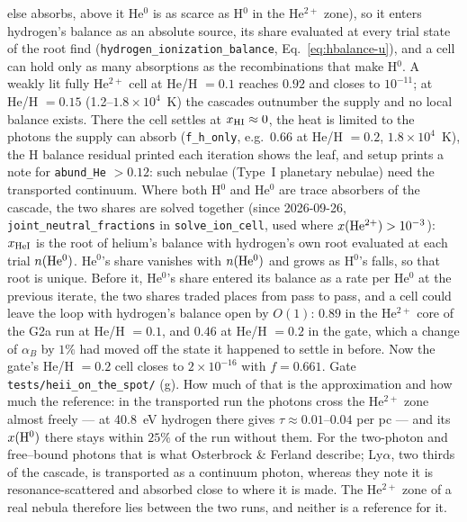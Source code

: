 \documentclass[english,a4paper]{my_memo}
\newcommand{\code}[1]{\texttt{#1}}
\begin{document}
else absorbs, above it He$^0$ is as scarce as H$^0$ in the He$^{2+}$ zone), so
it enters hydrogen's balance as an absolute source, its share evaluated at
every trial state of the root find
(\code{hydrogen\_ionization\_balance}, Eq.~\ref{eq:hbalance-u}), and a cell can hold only as many
absorptions as the recombinations that make H$^0$.  A weakly lit fully
He$^{2+}$ cell at He/H $=0.1$ reaches $0.92$ and closes to $10^{-11}$; at
He/H $=0.15$ (1.2--$1.8{\times}10^4$~K) the cascades outnumber the supply and
no local balance exists.  There the cell settles at $x_{\rm HI}\approx0$, the
heat is limited to the photons the supply can absorb (\code{f\_h\_only},
e.g.\ $0.66$ at He/H $=0.2$, $1.8{\times}10^4$~K), the H balance residual
printed each iteration shows the leaf, and setup prints a note for
\code{abund\_He} $>0.12$: such nebulae (Type~I planetary nebulae) need the
transported continuum.  Where both H$^0$ and He$^0$ are trace absorbers of
the cascade, the two shares are solved together (since 2026-09-26,
\code{joint\_neutral\_fractions} in \code{solve\_ion\_cell}, used where
$x({\rm He^{2+}}) > 10^{-3}$): $x_{\rm HeI}$ is the root of helium's balance
with hydrogen's own root evaluated at each trial $n({\rm He^0})$.  He$^0$'s
share vanishes with $n({\rm He^0})$ and grows as H$^0$'s falls, so that root
is unique.  Before it, He$^0$'s share entered its balance as a rate per
He$^0$ at the previous iterate, the two shares traded places from pass to
pass, and a cell could leave the loop with hydrogen's balance open by
$O(1)$: $0.89$ in the He$^{2+}$ core of the G2a run at He/H $=0.1$, and
$0.46$ at He/H $=0.2$ in the gate, which a change of $\alpha_B$ by $1\%$
had moved off the state it happened to settle in before.  Now the gate's
He/H $=0.2$ cell closes to $2{\times}10^{-16}$ with $f = 0.661$.  Gate
\code{tests/heii\_on\_the\_spot/} (g).  How much of that is the
approximation and how much the reference: in the transported run the
photons cross the He$^{2+}$ zone almost freely --- at 40.8~eV hydrogen
there gives $\tau\approx0.01$--$0.04$ per pc --- and its $x({\rm H^0})$
there stays within $25\%$ of the run without them.  For the two-photon and
free--bound photons that is what Osterbrock \& Ferland describe; Ly$\alpha$,
two thirds of the cascade, is transported as a continuum photon, whereas
they note it is resonance-scattered and absorbed close to where it is
made.  The He$^{2+}$ zone of a real nebula therefore lies between the two
runs, and neither is a reference for it.
\end{document}
